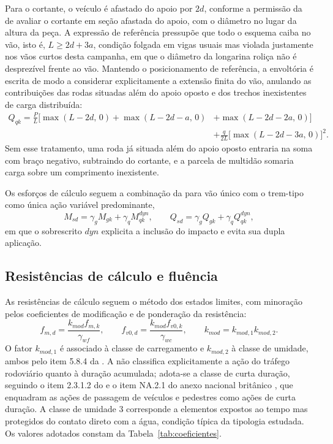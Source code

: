 Para o cortante, o veículo é afastado do apoio por $2d$, conforme a permissão da \textcite{NBR7190-1:2022} de avaliar o cortante em seção afastada do apoio, com o diâmetro no lugar da altura da peça. A expressão de referência pressupõe que todo o esquema caiba no vão, isto é, $L\geq2d+3a$, condição folgada em vigas usuais mas violada justamente nos vãos curtos desta campanha, em que o diâmetro da longarina roliça não é desprezível frente ao vão. Mantendo o posicionamento de referência, a envoltória é escrita de modo a considerar explicitamente a extensão finita do vão, anulando as contribuições das rodas situadas além do apoio oposto e dos trechos inexistentes de carga distribuída:
\begin{equation}
\begin{split}
Q_{qk}=\frac{P}{L}\Big[\max(L-2d,\,0)+\max(L-2d-a,\,0)&+\max(L-2d-2a,\,0)\Big]\\
&+\frac{q}{2L}\Big[\max(L-2d-3a,\,0)\Big]^{2}.
\end{split}
\label{eq:qqkenv}
\end{equation}
Sem esse tratamento, uma roda já situada além do apoio oposto entraria na soma com braço negativo, subtraindo do cortante, e a parcela de multidão somaria carga sobre um comprimento inexistente.

Os esforços de cálculo seguem a combinação da \textcite{NBR8681:2025} para vão único com o trem-tipo como única ação variável predominante,
\begin{equation}
M_{sd}=\gamma_g M_{gk}+\gamma_q M_{qk}^{dyn},\qquad
Q_{sd}=\gamma_g Q_{gk}+\gamma_q Q_{qk}^{dyn},
\label{eq:combinacao}
\end{equation}
em que o sobrescrito $dyn$ explicita a inclusão do impacto e evita sua dupla aplicação.

\subsection{Resistências de cálculo e fluência}\label{sec:resistencias}

As resistências de cálculo seguem o método dos estados limites, com minoração pelos coeficientes de modificação e de ponderação da resistência:
\begin{equation}
f_{m,d}=\frac{k_{mod}f_{m,k}}{\gamma_{wf}},\qquad
f_{v0,d}=\frac{k_{mod}f_{v0,k}}{\gamma_{wc}},\qquad
k_{mod}=k_{mod,1}k_{mod,2}.
\label{eq:resistencias}
\end{equation}
O fator $k_{mod,1}$ é associado à classe de carregamento e $k_{mod,2}$ à classe de umidade, ambos pelo item 5.8.4 da \textcite{NBR7190-1:2022}. A \textcite{NBR7190-1:2022} não classifica explicitamente a ação do tráfego rodoviário quanto à duração acumulada; adota-se a classe de curta duração, seguindo o item 2.3.1.2 do \textcite{EN1995-2:2004} e o item NA.2.1 do anexo nacional britânico \textcite{BSNA-EN1995-2:2004}, que enquadram as ações de passagem de veículos e pedestres como ações de curta duração. A classe de umidade 3 corresponde a elementos expostos ao tempo mas protegidos do contato direto com a água, condição típica da tipologia estudada. Os valores adotados constam da Tabela~\ref{tab:coeficientes}.

